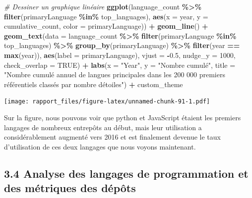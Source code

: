 \documentclass[
]{article}
\newenvironment{Shaded}{\begin{snugshade}}{\end{snugshade}}
\newcommand{\AttributeTok}[1]{\textcolor[rgb]{0.13,0.29,0.53}{#1}}
\newcommand{\CommentTok}[1]{\textcolor[rgb]{0.56,0.35,0.01}{\textit{#1}}}
\newcommand{\ConstantTok}[1]{\textcolor[rgb]{0.56,0.35,0.01}{#1}}
\newcommand{\DecValTok}[1]{\textcolor[rgb]{0.00,0.00,0.81}{#1}}
\newcommand{\FloatTok}[1]{\textcolor[rgb]{0.00,0.00,0.81}{#1}}
\newcommand{\FunctionTok}[1]{\textcolor[rgb]{0.13,0.29,0.53}{\textbf{#1}}}
\newcommand{\NormalTok}[1]{#1}
\newcommand{\SpecialCharTok}[1]{\textcolor[rgb]{0.81,0.36,0.00}{\textbf{#1}}}
\newcommand{\StringTok}[1]{\textcolor[rgb]{0.31,0.60,0.02}{#1}}
\begin{document}
\begin{Shaded}
\begin{Highlighting}[]
\CommentTok{\# Dessiner un graphique linéaire}
\FunctionTok{ggplot}\NormalTok{(language\_count }\SpecialCharTok{\%\textgreater{}\%} \FunctionTok{filter}\NormalTok{(primaryLanguage }\SpecialCharTok{\%in\%}\NormalTok{ top\_languages), }\FunctionTok{aes}\NormalTok{(}\AttributeTok{x =}\NormalTok{ year, }
\AttributeTok{y =}\NormalTok{ cumulative\_count, }\AttributeTok{color =}\NormalTok{ primaryLanguage)) }\SpecialCharTok{+}
  \FunctionTok{geom\_line}\NormalTok{() }\SpecialCharTok{+}
  \FunctionTok{geom\_text}\NormalTok{(}\AttributeTok{data =}\NormalTok{ language\_count }\SpecialCharTok{\%\textgreater{}\%} \FunctionTok{filter}\NormalTok{(primaryLanguage }\SpecialCharTok{\%in\%}\NormalTok{ top\_languages) }\SpecialCharTok{\%\textgreater{}\%} 
    \FunctionTok{group\_by}\NormalTok{(primaryLanguage) }\SpecialCharTok{\%\textgreater{}\%} \FunctionTok{filter}\NormalTok{(year }\SpecialCharTok{==} \FunctionTok{max}\NormalTok{(year)), }\FunctionTok{aes}\NormalTok{(}\AttributeTok{label =}\NormalTok{ primaryLanguage), }
    \AttributeTok{vjust =} \SpecialCharTok{{-}}\FloatTok{0.5}\NormalTok{, }\AttributeTok{nudge\_y =} \DecValTok{1000}\NormalTok{, }\AttributeTok{check\_overlap =} \ConstantTok{TRUE}\NormalTok{) }\SpecialCharTok{+}
  \FunctionTok{labs}\NormalTok{(}\AttributeTok{x =} \StringTok{"Year"}\NormalTok{, }\AttributeTok{y =} \StringTok{"Nombre cumulé"}\NormalTok{, }\AttributeTok{title =} \StringTok{"Nombre cumulé annuel de langues }
\StringTok{    principales dans les 200 000 premiers référentiels classés par nombre d\textquotesingle{}étoiles"}\NormalTok{) }\SpecialCharTok{+}
\NormalTok{  custom\_theme}
\end{Highlighting}
\end{Shaded}

\texttt{[image: rapport\_files/figure-latex/unnamed-chunk-91-1.pdf]}

Sur la figure, nous pouvons voir que python et JavaScript étaient les
premiers langages de nombreux entrepôts au début, mais leur utilisation
a considérablement augmenté vers 2016 et est finalement devenue le taux
d'utilisation de ces deux langages que nous voyons maintenant.

\subsection{3.4 Analyse des langages de programmation et des métriques
des
dépôts}\label{analyse-des-langages-de-programmation-et-des-muxe9triques-des-duxe9puxf4ts}
\end{document}
